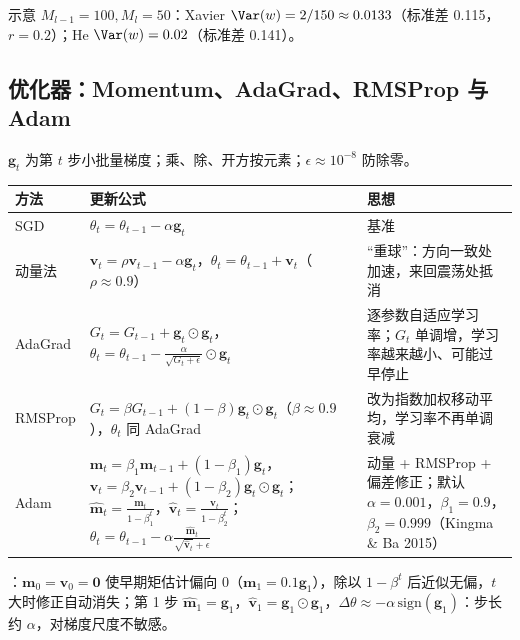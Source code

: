 \noindent 示意 $M_{l-1}=100,M_l=50$：Xavier $\Var(w)=2/150\approx0.0133$（标准差 0.115，$r=0.2$）；He $\Var(w)=0.02$（标准差 0.141）。

\subsection{优化器：Momentum、AdaGrad、RMSProp 与 Adam}
$\bm g_t$ 为第 $t$ 步小批量梯度；乘、除、开方按元素；$\epsilon\approx10^{-8}$ 防除零。\par
\noindent\begin{tabularx}{\linewidth}{@{}p{1.7cm}p{8.4cm}L@{}}
\toprule
方法 & 更新公式 & 思想 \\
\midrule
SGD & $\theta_t=\theta_{t-1}-\alpha\bm g_t$ & 基准 \\
动量法 & $\bm v_t=\rho\bm v_{t-1}-\alpha\bm g_t$，$\theta_t=\theta_{t-1}+\bm v_t$（$\rho\approx0.9$） & “重球”：方向一致处加速，来回震荡处抵消 \\
AdaGrad & $G_t=G_{t-1}+\bm g_t\odot\bm g_t$，$\theta_t=\theta_{t-1}-\frac{\alpha}{\sqrt{G_t+\epsilon}}\odot\bm g_t$ & 逐参数自适应学习率；$G_t$ 单调增，学习率越来越小、可能过早停止 \\
RMSProp & $G_t=\beta G_{t-1}+(1-\beta)\bm g_t\odot\bm g_t$（$\beta\approx0.9$），$\theta_t$ 同 AdaGrad & 改为指数加权移动平均，学习率不再单调衰减 \\
Adam & $\bm m_t=\beta_1\bm m_{t-1}+(1-\beta_1)\bm g_t$，$\bm v_t=\beta_2\bm v_{t-1}+(1-\beta_2)\bm g_t\odot\bm g_t$；$\hat{\bm m}_t=\frac{\bm m_t}{1-\beta_1^t}$，$\hat{\bm v}_t=\frac{\bm v_t}{1-\beta_2^t}$；$\theta_t=\theta_{t-1}-\alpha\frac{\hat{\bm m}_t}{\sqrt{\hat{\bm v}_t}+\epsilon}$ & 动量 + RMSProp + 偏差修正；默认 $\alpha=0.001$，$\beta_1=0.9$，$\beta_2=0.999$（Kingma \& Ba 2015） \\
\bottomrule
\end{tabularx}

\noindent{}：$\bm m_0=\bm v_0=\bm 0$ 使早期矩估计偏向 0（$\bm m_1=0.1\bm g_1$），除以 $1-\beta^t$ 后近似无偏，$t$ 大时修正自动消失；第 1 步 $\hat{\bm m}_1=\bm g_1$，$\hat{\bm v}_1=\bm g_1\odot\bm g_1$，$\Delta\theta\approx-\alpha\,\mathrm{sign}(\bm g_1)$：步长约 $\alpha$，对梯度尺度不敏感。

